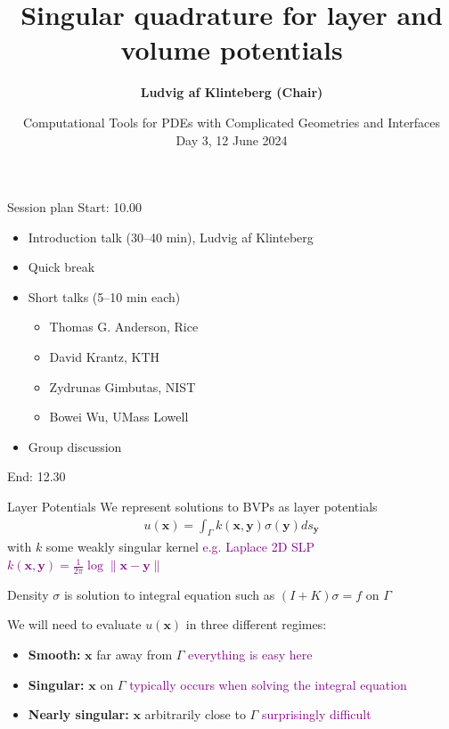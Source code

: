 \documentclass[t]{beamer}
\title{Singular quadrature for layer and volume potentials}
\date{Computational Tools for PDEs with Complicated Geometries and Interfaces\\
  Day 3, 12 June 2024}
\author{\textbf{Ludvig af Klinteberg (Chair)}\inst{1}}
\institute{\inst{1} Mälardalen University (MDU), Västerås, Sweden}
\newcommand{\mbf}[1]{{\bm #1}}           %
\newcommand{\com}[1]{{\scriptsize \textcolor{purple}{#1}}}      %
\newcommand{\vg}{\vspace{2ex}}
\newcommand{\sg}{\vspace{1ex}}
\newcommand{\xx}{\mbf{x}}
\newcommand{\yy}{\mbf{y}}
\begin{document}
\begin{frame}
	\titlepage
\end{frame}

\begin{frame}[c]{Session plan}
  Start: 10.00
  \bigskip
  \begin{itemize}
  \item Introduction talk (30--40 min), Ludvig af Klinteberg
  \item Quick break
  \item Short talks (5--10 min each)
    \begin{itemize}
    \item Thomas G. Anderson, Rice
    \item David Krantz, KTH
    \item Zydrunas Gimbutas, NIST
    \item Bowei Wu, UMass Lowell
    \end{itemize}
  \item Group discussion
  \end{itemize}
  \bigskip  
  End: 12.30
\end{frame}

\begin{frame}{Layer Potentials}
  We represent solutions to BVPs as layer potentials
  \begin{align}
    u(\xx) = \int_\Gamma k(\xx, \yy) \sigma(\yy) ds_\yy
  \end{align}
  with $k$ some weakly singular kernel \com{e.g. Laplace 2D SLP $k(\xx,
    \yy) = \frac{1}{2\pi} \log\|\xx-\yy\|$}

  \sg
  Density $\sigma$ is solution to integral equation such as $(I+K)\sigma=f$ on $\Gamma$

  \pause
  \vg
  We will need to evaluate $u(\xx)$ in three different regimes:
  \begin{itemize}
  \item \textbf{Smooth:} $\xx$ far away from $\Gamma$
    \hfill \com{everything is easy here}
  \item \textbf{Singular:} $\xx$ on $\Gamma$
    \hfill \com{typically occurs when solving the integral equation}
  \item \textbf{Nearly singular:} $\xx$ arbitrarily close to $\Gamma$
    \hfill \com{surprisingly difficult}
  \end{itemize}
\end{frame}
\end{document}
